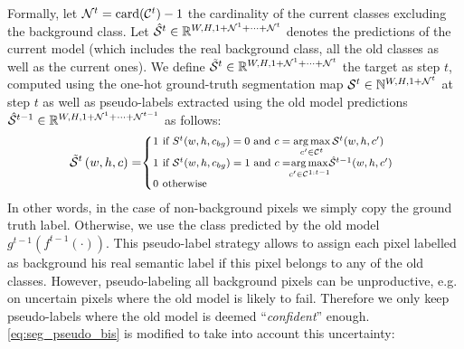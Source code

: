 Formally, let $\mathcal{N}^t=\operatorname{card}(\mathcal{C}^{t})-1$ the cardinality of the current classes
excluding the background class. Let $\hat{\mathcal{S}}^{t} \in \mathbb{R}^{W,H,1+\mathcal{N}^1 +\dots + \mathcal{N}^t}$
denotes the predictions of the current model (which includes the real background class, all the old
classes as well as the current ones). We define $\tilde{\mathcal{S}}^{t} \in \mathbb{R}^{W,H,1+\mathcal{N}^1
        +\dots + \mathcal{N}^t}$ the target as step $t$, computed using the one-hot ground-truth segmentation map
$\mathcal{S}^{t} \in \mathbb{N}^{W,H,1+\mathcal{N}^t}$ at step $t$ as well as pseudo-labels extracted using the
old model predictions $\hat{\mathcal{S}}^{t-1} \in \mathbb{R}^{W,H,1+\mathcal{N}^1 +\dots + \mathcal{N}^{t-1}}$ as
follows:
%
\begin{equation}
    \footnotesize
    \tilde \mcS^{t}\left(w,h,c\right)= \mkern-5mu \left\{\begin{array}{ll}
        \mkern-10mu 1 \mkern-27mu & \text { if } S^{t} (w,h,c_{bg})=0 \text { and } c = \argmax \limits_{c' \in \mcC^{t}} \mcS^{t}(w,h,c')                                     \\
        \mkern-10mu 1 \mkern-27mu & \text { if } \mcS^{t}(w,h,c_{bg})=1 \text { and } c = \mkern-8mu \argmax \limits_{c' \in \mcC^{1:t-1}} \mkern-6mu \hat{\mcS}^{t-1}(w,h,c') \\
        \mkern-10mu 0 \mkern-27mu & \text { otherwise }                                                                                                                        \\
    \end{array}\right.
    \label{eq:seg_pseudo_bis}
\end{equation}
%
In other words, in the case of non-background pixels we simply copy the ground truth label.
Otherwise, we use the class predicted by the old model $g^{t-1}(f^{t-1}(\cdot))$. This pseudo-label
strategy allows to assign each pixel labelled as background his real semantic label if this pixel
belongs to any of the old classes. However, pseudo-labeling all background pixels can be
unproductive, e.g. on uncertain pixels where the old model is likely to fail. Therefore we only keep
pseudo-labels where the old model is deemed ``\textit{confident}'' enough.
\autoref{eq:seg_pseudo_bis} is modified to take into account this uncertainty:
%
